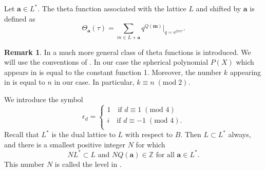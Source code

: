 \documentclass[11pt,a4paper]{amsart}
\theoremstyle{definition}
\newtheorem{remark}[theorem]{Remark}
\newcommand{\SZ}{\mathbb{Z}}                    %
\begin{document}
Let $\mathbf{a} \in L^{\ast}$. The theta function associated with the lattice $L$ and 
shifted by $\mathbf{a}$ is defined as
\begin{equation}
\Theta_{\mathbf{a}}(\tau)= \sum_{m \in L+\mathbf{a}} q^{Q(\mathbf{m})} \Big|_{q=\mathrm{e}^{2 \pi i \tau}}.
\label{eq:thetadef}
\end{equation}
\begin{remark} In \cite[Definition 14.3.3]{cohen2017modular} a much more general class of theta functions is introduced. We will use the conventions of \cite[Example 14.2.5]{cohen2017modular}. In our case the spherical polynomial $P(X)$ which appears in \cite[14.2.5]{cohen2017modular} is equal to the constant function 1. Moreover, the number $k$ appearing in  \cite[Example 14.2.5 and Definition 14.3.3]{cohen2017modular} is equal to $n$ in our case. In particular, $k \equiv n \;(\mathrm{mod}\;2)$.
\end{remark}

We introduce the symbol 
\begin{equation}
\label{eq:epsilondef}
\epsilon_d  = \begin{cases}
1 \quad \textrm{if } d\equiv 1 \; (\textrm{mod } 4) \\
i \quad \textrm{if } d\equiv -1 \; (\textrm{mod } 4). \\
\end{cases}
\end{equation}
Recall that $L^{\ast}$ is the dual lattice to $L$ with respect to $B$. Then $L \subset L^{\ast}$ always, and there is a smallest positive integer $N$ for which   
\begin{equation} 
\label{eq:Ndef}
NL^{\ast} \subset L \textrm{ and }NQ(\mathbf{a}) \in \SZ \textrm{ for all } \mathbf{a} \in L^{\ast}.\end{equation} 
This number $N$ is called the level in \cite[Definition 14.3.15]{cohen2017modular}.
\end{document}
